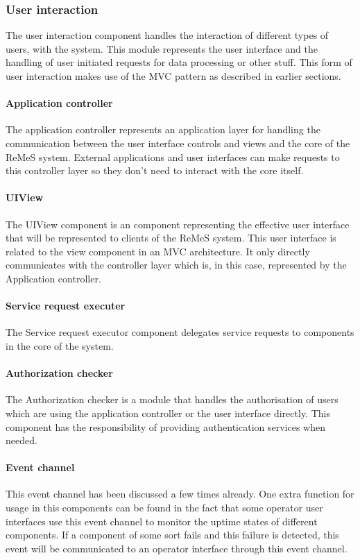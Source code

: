 \subsubsection{User interaction}
The user interaction component handles the interaction of different types of users, with the system.
This module represents the user interface and the handling of user initiated requests for data processing or 
other stuff. This form of user interaction makes use of the MVC pattern as described in earlier sections.
\paragraph{Application controller} 
The application controller represents an application layer for handling the communication between the user interface controls and views and the core of the ReMeS system. External applications and user interfaces can make requests to this controller layer so they don't need to interact with the core itself.
\paragraph{UIView} 
The UIView component is an component representing the effective user interface that will be represented to clients of the ReMeS system. This user interface is related to the view component in an MVC architecture. It only directly communicates with the controller layer which is, in this case, represented by the Application controller.
\paragraph{Service request executer} 
The Service request executor component delegates service requests to components in the core of the system.
\paragraph{Authorization checker}
The Authorization checker is a module that handles the authorisation of users which are using the application controller or the user interface directly. This component has the responsibility of providing authentication services when needed.
\paragraph{Event channel}  
This event channel has been discussed a few times already. 
One extra function for usage in this components can be found in the fact that some operator user interfaces use this event channel to monitor the uptime states of different components. If a component of some sort fails and this failure is detected, this event will be communicated to an operator interface through this event channel.
